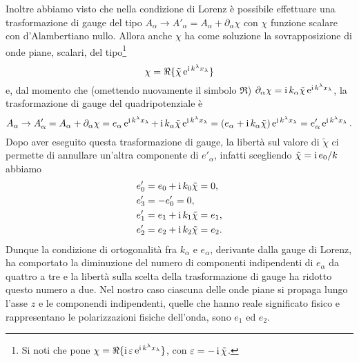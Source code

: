 Inoltre abbiamo visto che nella condizione di Lorenz è possibile effettuare una
trasformazione di gauge del tipo
$A_{\alpha} \to A'_{\alpha} = A_{\alpha} + \partial_{\alpha}\chi$ con $\chi$
funzione scalare con d'Alambertiano nullo.  Allora anche $\chi$ ha come
soluzione la sovrapposizione di onde piane, scalari, del
tipo\footnote{Si noti che \textcite[258]{weinberg:gravitation} pone
  $\chi = \Re \{\operatorname{\mathrm{i}} \varepsilon\operatorname{\mathrm{e}}^{\operatorname{\mathrm{i}} k^{\lambda}x_{\lambda}}\}$, con
  $\varepsilon = -\operatorname{\mathrm{i}} \tilde{\chi}$.}
\begin{equation}
  \chi = \Re \{\tilde{\chi} \operatorname{\mathrm{e}}^{\operatorname{\mathrm{i}} k^{\lambda}x_{\lambda}}\}
\end{equation}
e, dal momento che (omettendo nuovamente il simbolo $\Re$)
$\partial_{\alpha} \chi = \operatorname{\mathrm{i}} k_{\alpha}
\tilde{\chi}\operatorname{\mathrm{e}}^{\operatorname{\mathrm{i}} k^{\lambda}x_{\lambda}}$,
la trasformazione di gauge del quadripotenziale è
\begin{equation}
  A_{\alpha} \to A'_{\alpha} = A_{\alpha} + \partial_{\alpha}\chi = e_{\alpha}
  \operatorname{\mathrm{e}}^{\operatorname{\mathrm{i}} k^{\lambda}x_{\lambda}} + \operatorname{\mathrm{i}} k_{\alpha}  \tilde{\chi}\operatorname{\mathrm{e}}^{\operatorname{\mathrm{i}}
    k^{\lambda}x_{\lambda}} = (e_{\alpha} + \operatorname{\mathrm{i}} k_{\alpha}
  \tilde{\chi})\operatorname{\mathrm{e}}^{\operatorname{\mathrm{i}} k^{\lambda}x_{\lambda}} = e'_{\alpha}\operatorname{\mathrm{e}}^{\operatorname{\mathrm{i}}
    k^{\lambda}x_{\lambda}}.
\end{equation}
Dopo aver eseguito questa trasformazione di gauge, la libertà sul valore di
$\tilde{\chi}$ ci permette di annullare un'altra componente di $e'_{\alpha}$,
infatti scegliendo $\tilde{\chi} = \operatorname{\mathrm{i}} e_{0}/k$ abbiamo
\begin{subequations}
  \begin{align}
    e'_{0} &= e_{0} + \operatorname{\mathrm{i}} k_{0} \tilde{\chi} = 0, \\
    e'_{3} &= -e'_{0} = 0, \\
    e'_{1} &= e_{1} + \operatorname{\mathrm{i}} k_{1} \tilde{\chi} = e_{1}, \\
    e'_{2} &= e_{2} + \operatorname{\mathrm{i}} k_{2} \tilde{\chi} = e_{2}.
  \end{align}
\end{subequations}
Dunque la condizione di ortogonalità fra $k_{\alpha}$ e $e_{\alpha}$, derivante
dalla gauge di Lorenz, ha comportato la diminuzione del numero di componenti
indipendenti di $e_{\alpha}$ da quattro a tre e la libertà sulla scelta della
trasformazione di gauge ha ridotto questo numero a due.  Nel nostro caso
ciascuna delle onde piane si propaga lungo l'asse $z$ e le componendi
indipendenti, quelle che hanno reale significato fisico e rappresentano le
polarizzazioni fisiche dell'onda, sono $e_{1}$ ed $e_{2}$.

